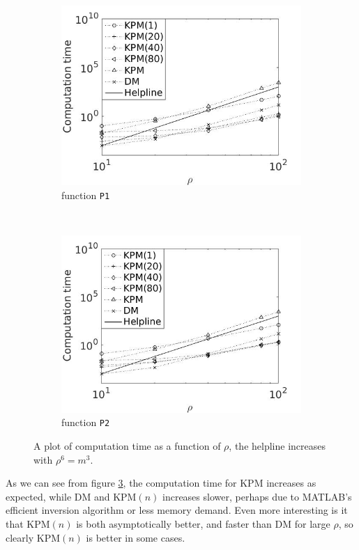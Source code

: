 \begin{figure}[H]
        \centering
        \begin{subfigure}[b]{0.45\textwidth}
                \includegraphics[width=\textwidth]{fig/n5timevsm1}
                \caption{function \texttt{P1}}
                \label{fig:timem1}
        \end{subfigure}%
        ~
        \begin{subfigure}[b]{0.45\textwidth}
                \includegraphics[width=\textwidth]{fig/n6timevsm2}
                \caption{function \texttt{P2}}
                \label{fig:timem2}
        \end{subfigure}
        \caption{A plot of computation time as a function of $\rho$, the helpline increases with $\rho^6 = m^3$.}\label{fig:timem}
\end{figure}
As we can see from figure \ref{fig:timem}, the computation time for KPM increases as expected, while DM and KPM$(n)$ increases slower, perhaps due to MATLAB's efficient inversion algorithm or less memory demand. 
Even more interesting is it that KPM$(n)$ is both asymptotically better, and faster than DM for large $\rho$, so clearly KPM$(n)$ is better in some cases.
